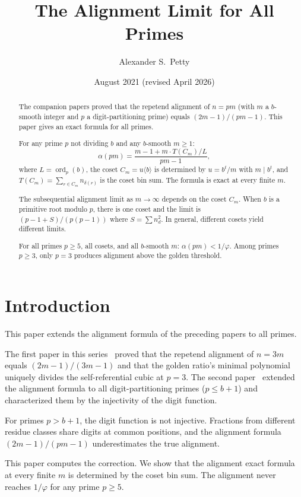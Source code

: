 \documentclass[12pt]{amsart}
\title{The Alignment Limit for All Primes}
\author{Alexander S.\ Petty}
\date{August 2021 (revised April 2026)}
\theoremstyle{definition}
\theoremstyle{remark}
\begin{document}
\begin{abstract}
The companion papers proved that the repetend alignment of
$n = pm$ (with $m$ a $b$-smooth integer and $p$ a
digit-partitioning prime) equals $(2m{-}1)/(pm{-}1)$.
This paper gives an exact formula for all primes.

For any prime $p$ not dividing $b$ and any $b$-smooth
$m \ge 1$:
\[
\alpha(pm) = \frac{m - 1 + m \cdot T(C_m)/L}{pm - 1},
\]
where $L = \operatorname{ord}_p(b)$, the coset
$C_m = u\langle b \rangle$ is determined by $u = b^t/m$
with $m \mid b^t$, and $T(C_m) = \sum_{r \in C_m}
n_{\delta(r)}$ is the coset bin sum. The formula is
exact at every finite $m$.

The subsequential alignment limit as $m \to \infty$
depends on the coset $C_m$. When $b$ is a primitive
root modulo $p$, there is one coset and the limit
is $(p{-}1+S)/(p(p{-}1))$ where $S = \sum n_d^2$.
In general, different cosets yield different limits.

For all primes $p \ge 5$, all cosets, and all
$b$-smooth $m$: $\alpha(pm) < 1/\varphi$. Among
primes $p \ge 3$, only $p = 3$ produces alignment
above the golden threshold.
\end{abstract}
\maketitle

\section{Introduction}

This paper extends the alignment formula of the preceding papers to all primes.

The first paper in this series~\cite{paper1} proved that the
repetend alignment of $n = 3m$ equals $(2m{-}1)/(3m{-}1)$ and that
the golden ratio's minimal polynomial uniquely divides the
self-referential cubic at $p = 3$. The second paper~\cite{paper2} extended the alignment
formula to all digit-partitioning primes ($p \le b{+}1$) and
characterized them by the injectivity of the digit function.

For primes $p > b{+}1$, the digit function is not
injective. Fractions from different residue classes share
digits at common positions, and the alignment formula
$(2m{-}1)/(pm{-}1)$ underestimates the true alignment.

This paper computes the correction. We show that the alignment
exact formula at every finite $m$ is determined by the
coset bin sum. The alignment never reaches $1/\varphi$
for any prime $p \ge 5$.
\end{document}
